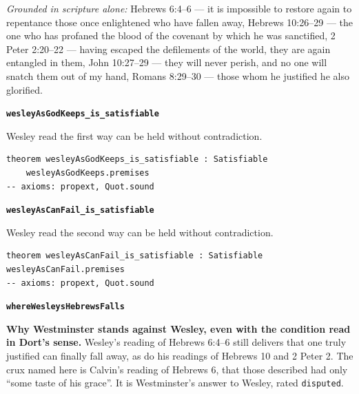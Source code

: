 \documentclass[11pt]{article}
\begin{document}
\emph{Grounded in scripture alone:} Hebrews 6:4–6 — it is impossible to restore again to repentance those once enlightened who have fallen away, Hebrews 10:26–29 — the one who has profaned the blood of the covenant by which he was sanctified, 2 Peter 2:20–22 — having escaped the defilements of the world, they are again entangled in them, John 10:27–29 — they will never perish, and no one will snatch them out of my hand, Romans 8:29–30 — those whom he justified he also glorified.
\par\medskip\noindent\textbf{\texttt{wesley\allowbreak{}As\allowbreak{}God\allowbreak{}Keeps\_\allowbreak{}is\_\allowbreak{}satisfiable}}\par\nobreak\noindent
Wesley read the first way can be held without contradiction.

{\small\begin{verbatim}
theorem wesleyAsGodKeeps_is_satisfiable : Satisfiable
    wesleyAsGodKeeps.premises
-- axioms: propext, Quot.sound
\end{verbatim}}
\par\medskip\noindent\textbf{\texttt{wesley\allowbreak{}As\allowbreak{}Can\allowbreak{}Fail\_\allowbreak{}is\_\allowbreak{}satisfiable}}\par\nobreak\noindent
Wesley read the second way can be held without contradiction.

{\small\begin{verbatim}
theorem wesleyAsCanFail_is_satisfiable : Satisfiable wesleyAsCanFail.premises
-- axioms: propext, Quot.sound
\end{verbatim}}
\par\medskip\noindent\textbf{\texttt{where\allowbreak{}Wesleys\allowbreak{}Hebrews\allowbreak{}Falls}}\par\nobreak\noindent
\textbf{Why Westminster stands against Wesley, even with the condition read in Dort’s sense.} Wesley’s reading of Hebrews 6:4–6 still delivers that one truly justified can finally fall away, as do his readings of Hebrews 10 and 2 Peter 2. The crux named here is Calvin’s reading of Hebrews 6, that those described had only “some taste of his grace”. It is Westminster’s answer to Wesley, rated \texttt{disputed}.
\end{document}
